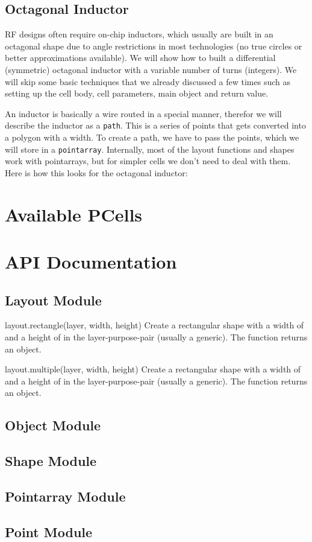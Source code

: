 \subsection{Octagonal Inductor}
RF designs often require on-chip inductors, which usually are built in an octagonal shape due to angle restrictions in most technologies (no true circles or better
approximations available). We will show how to built a differential (symmetric) octagonal inductor with a variable number of turns (integers). We will skip some
basic techniques that we already discussed a few times such as setting up the cell body, cell parameters, main object and return value.

An inductor is basically a wire routed in a special manner, therefor we will describe the inductor as a \lstinline!path!. This is a series of points that gets converted
into a polygon with a width. To create a path, we have to pass the points, which we will store in a \lstinline!pointarray!. Internally, most of the layout functions
and shapes work with pointarrays, but for simpler cells we don't need to deal with them. Here is how this looks for the octagonal inductor:


\section{Available PCells}
\section{API Documentation}
\subsection{Layout Module}
\begin{apifunc}{layout.rectangle(layer, width, height)} 
    Create a rectangular shape with a width of  and a height of  in the layer-purpose-pair  (usually a generic). The function
    returns an object.
\end{apifunc}
\begin{apifunc}{layout.multiple(layer, width, height)} 
    Create a rectangular shape with a width of  and a height of  in the layer-purpose-pair  (usually a generic). The function
    returns an object.
\end{apifunc}
\subsection{Object Module}
\subsection{Shape Module}
\subsection{Pointarray Module}
\subsection{Point Module}


